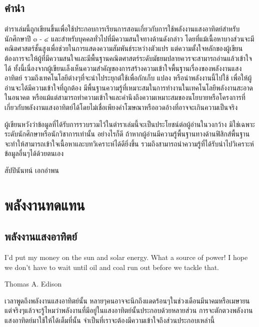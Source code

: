 \documentclass[a4paper,nobib,openany,10pt]{tufte-book}
\begin{document}
\restoregeometry
\pagecolor{White}

\frontmatter


\chapter{คำนำ}
\label{sec:org3504f75}

ตำราเล่มนี้ถูกเขียนขึ้นเพื่อใช้ประกอบการเรียนการสอนเกี่ยวกับการใช้พลังงานแสงอาทิตย์สำหรับนักศึกษาปี ๓ - ๔ และสำหรับบุคคลทั่วไปที่มีความสนใจทางด้านดังกล่าว โดยที่แม้เนื้อหาบางส่วนจะมีคณิตศาสตร์ชั้นสูงเพื่อช่วยในการแสดงความสัมพันธ์ระหว่างตัวแปร แต่ความตั้งใจหลักของผู้เขียนต้องการจะให้ผู้ที่มีความสนใจและมีพื้นฐานคณิตศาสตร์ระดับมัธยมปลายควรจะสามารถอ่านแล้วเข้าใจได้ ทั้งนี้เนื่องจากผู้เขียนเล็งเห็นความสำคัญของการสร้างความเข้าใจพื้นฐานเรื่องของพลังงานแสงอาทิตย์ รวมถึงเทคโนโลยีต่างๆที่จะนำไประยุกต์ใช้เพื่อกักเก็บ แปลง หรือนำพลังงานนี้ไปใช้ เพื่อให้ผู้อ่านจะได้มีความเข้าใจที่ถูกต้อง มีพื้นฐานความรู้ที่เหมาะสมในการทำงานในเทคโนโลยีพลังงานสะอาดในอนาคต หรือแม้แต่สามารถทำความเข้าใจและคำนึงถึงความเหมาะสมของนโยบายหรือโครงการที่เกี่ยวกับพลังงานแสงอาทิตย์ได้โดยไม่เชื่อเพียงคำโฆษณาหรืออวดอ้างที่อาจจะเกินความเป็นจริง

ผู้เขียนหวังว่าข้อมูลที่ได้รับการรวบรวมไว้ในตำราเล่มนี้จะเป็นประโยชน์ต่อผู้อ่านในวงกว้าง
มิใช่เฉพาะระดับนักศึกษาหรือนักวิชาการเท่านั้น อย่างไรก็ดี
ถ้าหากผู้อ่านมีความรู้พื้นฐานทางด้านฟิสิกส์พื้นฐาน
จะทำให้สามารถเข้าใจเนื้อหาและบทวิเคราะห์ได้ดียิ่งขึ้น
รวมถึงสามารถนำความรู้ที่ได้รับนำไปวิเคราะห์ข้อมูลอื่นๆได้ด้วยตนเอง

สัปปินันทน์ เอกอำพน

\tableofcontents

\listoffigures

\listoftables

\mainmatter


\part{พลังงานทดแทน}
\label{sec:org3d4a55a}
\chapter{พลังงานแสงอาทิตย์}
\label{sec:org8ca1e70}

\epigraph{I'd put my money on the sun and solar energy. What a source of power! I hope we don't have to wait until oil and coal run out before we tackle that.}{Thomas A. Edison}

เวลาพูดถึงพลังงานแสงอาทิตย์นั้น
หลายๆคนอาจจะนึกถึงแดดร้อนๆในช่วงเดือนมีนาคมหรือเมษายน
แต่จริงๆแล้วจะรู้ไหมว่าพลังงานที่มีอยู่ในแสงอาทิตย์นั้นประกอบด้วยหลายส่วน
การจะตักตวงพลังงานแสงอาทิตย์มาใช้ให้ได้เต็มที่นั้น
จำเป็นที่เราจะต้องมีความเข้าใจถึงส่วนประกอบเหล่านี้
\end{document}
